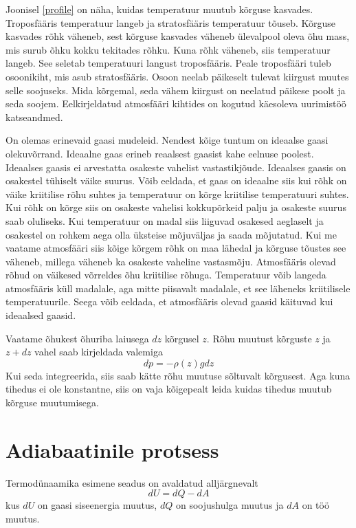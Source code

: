 \documentclass{trkut}%
\begin{document}
Joonisel \ref{profile} on näha, kuidas temperatuur muutub kõrguse kasvades. Troposfääris temperatuur langeb ja stratosfääris temperatuur tõuseb. Kõrguse kasvades rõhk väheneb, sest kõrguse kasvades väheneb ülevalpool oleva õhu mass, mis surub õhku kokku tekitades rõhku. Kuna rõhk väheneb, siis temperatuur langeb. See seletab temperatuuri langust troposfääris. Peale troposfääri tuleb osoonikiht, mis asub stratosfääris. Osoon neelab päikeselt tulevat kiirgust muutes selle soojuseks. Mida kõrgemal, seda vähem kiirgust on neelatud päikese poolt ja seda soojem. Eelkirjeldatud atmosfääri kihtides on kogutud käesoleva uurimistöö katseandmed.

On olemas erinevaid gaasi mudeleid. Nendest kõige tuntum on ideaalse gaasi olekuvõrrand. Ideaalne gaas erineb reaalsest gaasist kahe eelnuse poolest. Ideaalses gaasis ei arvestatta osakeste vahelist vastastikjõude. Ideaalses gaasis on osakestel tühiselt väike suurus. Võib eeldada, et gaas on ideaalne siis kui rõhk on väike kriitilise rõhu suhtes ja temperatuur on kõrge kriitilise temperatuuri suhtes. Kui rõhk on kõrge siis on osakeste vahelisi kokkupõrkeid palju ja osakeste suurus saab oluliseks. Kui temperatuur on madal siis liiguvad osakesed aeglaselt ja osakestel on rohkem aega olla üksteise mõjuväljas ja saada mõjutatud. Kui me vaatame atmosfääri siis kõige kõrgem rõhk on maa lähedal ja kõrguse tõustes see väheneb, millega väheneb ka osakeste vaheline vastasmõju. Atmosfääris olevad rõhud on väikesed võrreldes õhu kriitilise rõhuga. Temperatuur võib langeda atmosfääris küll madalale, aga mitte piisavalt madalale, et see läheneks kriitilisele temperatuurile. Seega võib eeldada, et atmosfääris olevad gaasid käituvad kui ideaalsed gaasid.


Vaatame õhukest õhuriba laiusega $dz$ kõrgusel $z$. Rõhu muutust kõrguste $z$ ja $z + dz$ vahel saab kirjeldada valemiga
\begin{equation}\label{eq10}
dp=-\rho (z) gdz
\end{equation}
Kui seda integreerida, siis saab kätte rõhu muutuse sõltuvalt kõrgusest. Aga kuna tihedus ei ole konstantne, siis on vaja kõigepealt leida kuidas tihedus muutub kõrguse muutumisega.




\section{Adiabaatinile protsess}
Termodünaamika esimene seadus on avaldatud alljärgnevalt
\begin{equation}\label{eq1}
dU = dQ - dA
\end{equation}
kus $dU$ on gaasi siseenergia muutus, $dQ$ on soojushulga muutus ja $dA$ on töö muutus.
\end{document}
